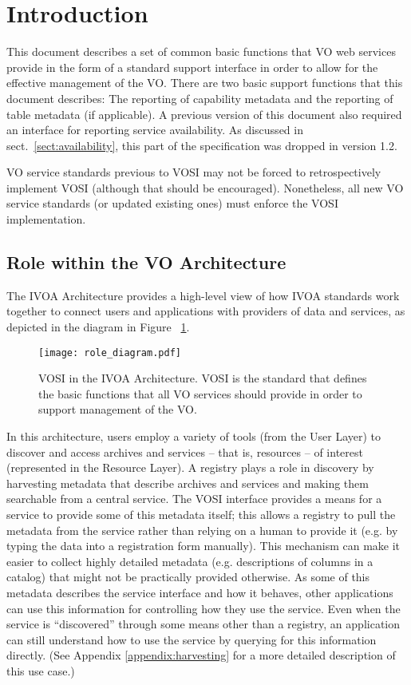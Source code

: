 \documentclass[11pt,letter]{ivoa}
\begin{document}
\section{Introduction}
\label{sec:introduction}

This document describes a set of common basic functions that VO web
services provide in the form of a standard support interface in order to
allow for the effective management of the VO.  There are two basic
support functions that this document describes:  The reporting of
capability metadata and
the reporting of table metadata (if applicable).  A previous version of
this document also required an interface for reporting service
availability.  As discussed in sect.~\ref{sect:availability}, this
part of the specification was dropped in version 1.2.

VO service standards previous to VOSI may not be forced to
retrospectively implement VOSI (although that should be encouraged).
Nonetheless, all new VO service standards (or updated existing ones)
must enforce the VOSI implementation.


\subsection{Role within the VO Architecture}

The IVOA Architecture \citep{2021ivoa.spec.1101D} provides a high-level
view of how IVOA standards work together to connect users and
applications with providers of data and services, as depicted in the
diagram in Figure ~\ref{fig:archdiag}. 

\begin{figure}
\centering
\texttt{[image: role\_diagram.pdf]}
\caption{VOSI in the IVOA Architecture. VOSI is the standard that
defines the basic functions that all VO services should provide in order
to support management of the VO.}
\label{fig:archdiag}
\end{figure}

In this architecture, users employ a variety of tools (from the User
Layer) to discover and access archives and services -- that is,
resources -- of interest (represented in the Resource Layer). A registry
plays a role in discovery by harvesting metadata that describe archives
and services and making them searchable from a central service. The VOSI
interface provides a means for a service to provide some of this
metadata itself; this allows a registry to pull the metadata from the
service rather than relying on a human to provide it (e.g. by typing the
data into a registration form manually). This mechanism can make it
easier to collect highly detailed metadata (e.g. descriptions of columns
in a catalog) that might not be practically provided otherwise. As some
of this metadata describes the service interface and how it behaves,
other applications can use this information for controlling how they use
the service. Even when the service is ``discovered'' through some means
other than a registry, an application can still understand how to use
the service by querying for this information directly. (See Appendix
\ref{appendix:harvesting} for a more detailed description of this use
case.)
\end{document}
